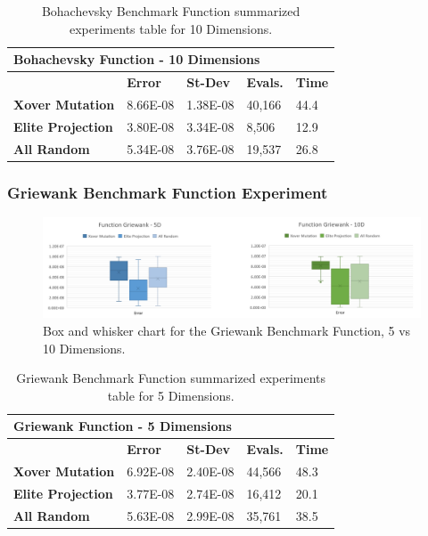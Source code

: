 \documentclass[graybox]{svmult}
\begin{document}
\begin{table}[]
    \scriptsize
    \centering
    \caption{Bohachevsky Benchmark Function summarized experiments table for 10 Dimensions.}\label{tab.fun_bohachevsky10}
    \begin{tabular}{@{}lllll@{}}
    \toprule
    \multicolumn{5}{l}{\textbf{Bohachevsky Function - 10 Dimensions}} \\ \midrule
     & \textbf{Error} & \textbf{St-Dev} & \textbf{Evals.} & \textbf{Time} \\
    \textbf{Xover Mutation} & 8.66E-08 & 1.38E-08 & 40,166 & 44.4 \\
    \textbf{Elite Projection} & 3.80E-08 & 3.34E-08 & 8,506 & 12.9 \\
    \textbf{All Random} & 5.34E-08 & 3.76E-08 & 19,537 & 26.8 \\ \bottomrule
    \end{tabular}
    \end{table}


\subsubsection{Griewank Benchmark Function Experiment}

\begin{figure}
    \includegraphics[width=\textwidth]{img/fig_fun_griewank.pdf}
    \caption{Box and whisker chart for the Griewank Benchmark Function, 5 vs 10 Dimensions.} \label{fig.fun_griewank}
    \end{figure}

\begin{table}[]
    \scriptsize
    \centering
    \caption{Griewank Benchmark Function summarized experiments table for 5 Dimensions.}\label{tab.fun_griewank5}
    \begin{tabular}{@{}lllll@{}}
    \toprule
    \multicolumn{5}{l}{\textbf{Griewank Function - 5 Dimensions}} \\ \midrule
     & \textbf{Error} & \textbf{St-Dev} & \textbf{Evals.} & \textbf{Time} \\
    \textbf{Xover Mutation} & 6.92E-08 & 2.40E-08 & 44,566 & 48.3 \\
    \textbf{Elite Projection} & 3.77E-08 & 2.74E-08 & 16,412 & 20.1 \\
    \textbf{All Random} & 5.63E-08 & 2.99E-08 & 35,761 & 38.5 \\ \bottomrule
    \end{tabular}
    \end{table}
\end{document}
